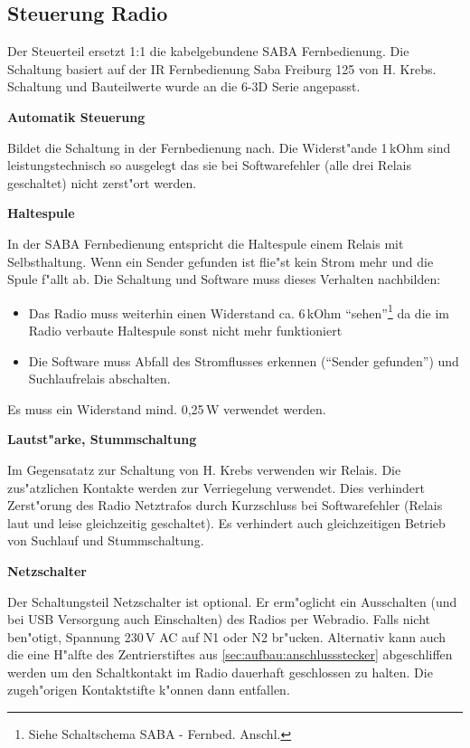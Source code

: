 \documentclass[ngerman,11pt,parskip=half] {scrartcl}
\begin{document}
\subsection{Steuerung Radio} \label{sec:schaltung:steuern-radio}

Der Steuerteil ersetzt 1:1 die kabelgebundene SABA Fernbedienung. Die Schaltung basiert auf der IR Fernbedienung Saba Freiburg 125 von H. Krebs. Schaltung und Bauteilwerte wurde an die 6-3D Serie angepasst.

\textbf{Automatik Steuerung}

Bildet die Schaltung in der Fernbedienung nach. Die Widerst"ande 1\,kOhm sind leistungstechnisch so ausgelegt das sie bei Softwarefehler (alle drei Relais geschaltet) nicht zerst"ort werden.

\textbf{Haltespule}

In der SABA Fernbedienung entspricht die Haltespule einem Relais mit Selbsthaltung. Wenn ein Sender gefunden ist flie"st kein Strom mehr und die Spule f"allt ab. Die Schaltung und Software muss dieses Verhalten nachbilden:
\begin{itemize}
\item Das Radio muss weiterhin einen Widerstand ca. 6\,kOhm "`sehen"'\footnote{Siehe Schaltschema SABA - Fernbed. Anschl.} da die im Radio verbaute Haltespule sonst nicht mehr funktioniert
\item Die Software muss Abfall des Stromflusses erkennen ("`Sender gefunden"') und Suchlaufrelais abschalten.
\end{itemize}
Es muss ein Widerstand mind. 0,25\,W verwendet werden.

\textbf{Lautst"arke, Stummschaltung}

Im Gegensatatz zur Schaltung von H. Krebs verwenden wir Relais. Die zus"atzlichen Kontakte werden zur Verriegelung verwendet. Dies verhindert Zerst"orung des Radio Netztrafos durch Kurzschluss bei Softwarefehler (Relais laut und leise gleichzeitig geschaltet). Es verhindert auch gleichzeitigen Betrieb von Suchlauf und Stummschaltung.

\textbf{Netzschalter}

Der Schaltungsteil Netzschalter ist optional. Er erm"oglicht ein Ausschalten (und bei USB Versorgung auch Einschalten) des Radios per Webradio. Falls nicht ben"otigt, Spannung 230\,V AC auf N1 oder N2 br"ucken. Alternativ kann auch die eine H"alfte des Zentrierstiftes aus \ref{sec:aufbau:anschlussstecker} abgeschliffen werden um den Schaltkontakt im Radio dauerhaft geschlossen zu halten. Die zugeh"origen Kontaktstifte k"onnen dann entfallen.
\end{document}
